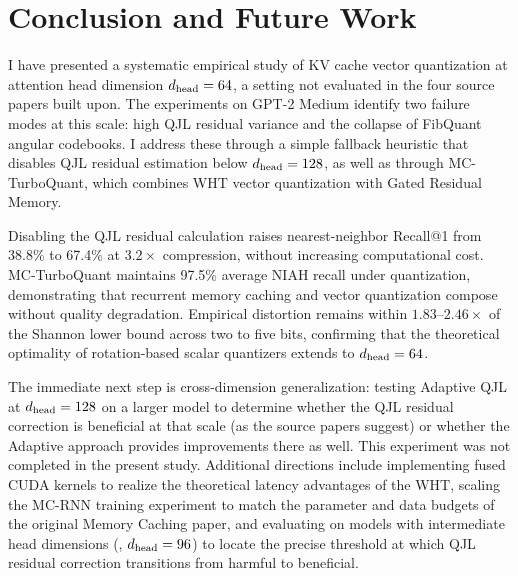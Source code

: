 
\section{Conclusion and Future Work}
\label{sec:conclusion}

I have presented a systematic empirical study of KV cache vector
quantization at attention head dimension $d_{\text{head}} = 64$, a setting not
evaluated in the four source papers built upon.
The experiments on GPT-2 Medium identify two failure modes at this scale: high QJL residual variance and the collapse of FibQuant angular codebooks. I address these through a simple fallback heuristic that disables QJL residual estimation below $d_{\text{head}} = 128$, as well as through MC-TurboQuant, which combines WHT vector quantization with Gated Residual Memory.

Disabling the QJL residual calculation raises nearest-neighbor Recall@1 from 38.8\% to 67.4\% at $3.2{\times}$ compression, without increasing computational cost.
MC-TurboQuant maintains 97.5\% average NIAH recall under quantization,
demonstrating that recurrent memory caching and vector quantization
compose without quality degradation.
Empirical distortion remains within $1.83$--$2.46{\times}$ of the
Shannon lower bound across two to five bits, confirming that the
theoretical optimality of rotation-based scalar quantizers extends
to $d_{\text{head}} = 64$.

The immediate next step is cross-dimension generalization: testing
Adaptive QJL at $d_{\text{head}} = 128$ on a larger model to determine whether
the QJL residual correction is beneficial at that scale (as the
source papers suggest) or whether the Adaptive approach provides
improvements there as well.
This experiment was not completed in the present study.
Additional directions include implementing fused CUDA kernels to
realize the theoretical latency advantages of the WHT, scaling the
MC-RNN training experiment to match the parameter and data budgets
of the original Memory Caching paper, and evaluating on models with
intermediate head dimensions (\eg, $d_{\text{head}} = 96$) to locate the
precise threshold at which QJL residual correction transitions from
harmful to beneficial.
